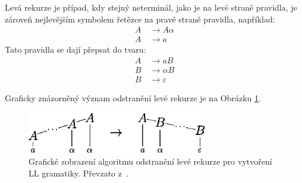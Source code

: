 Levá rekurze je případ, kdy stejný neterminál, jako je na levé straně pravidla, je zároveň nejlevějším symbolem řetězce na pravé straně pravidla, například:
\begin{align*}
    A~&\rightarrow A\alpha\\
    A~&\rightarrow a
\end{align*}
Tato pravidla se dají přepsat do tvaru:
\begin{align*}
    A~&\rightarrow aB\\
    B &\rightarrow \alpha B\\
    B &\rightarrow \varepsilon
\end{align*}

Graficky znázorněný význam odstranění levé rekurze je na Obrázku \ref{fig_leva_rekurze}.

\begin{figure}[ht]
    \centering
    \includegraphics[width=0.7\textwidth]{obrazky-figures/leva_rekurze.eps}
    \caption{Grafické zobrazení algoritmu odstranění levé rekurze pro vytvoření LL gramatiky. Převzato z~\cite{meduna2017sa-shora-dolu}.}
    \label{fig_leva_rekurze}
\end{figure}

